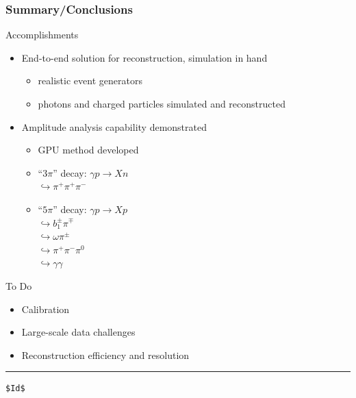 \documentclass[xcolor=dvipsnames,hyperref={pdfpagelabels=false}]{beamer}
\newcommand{\bi}{\begin{itemize}}
\newcommand{\ei}{\end{itemize}}
\newcommand{\I}{\item}
\newcommand{\ft}{\frametitle}
\begin{document}
\begin{frame}[fragile]
\ft{Summary/Conclusions}
Accomplishments
\bi
\I End-to-end solution for reconstruction, simulation in hand
   \bi
   \I realistic event generators
   \I photons and charged particles simulated and reconstructed
   \ei
\I Amplitude analysis capability demonstrated
   \bi
   \I GPU method developed
   \I ``$3\pi$'' decay: $\gamma p \rightarrow Xn$ \\ \hspace{1.1in}$\hookrightarrow\pi^+\pi^+\pi^-$
   \I ``$5\pi$'' decay: $\gamma p \rightarrow Xp$ \\ \hspace{1.05in} $\hookrightarrow b^\pm_1\pi^\mp$ \\ \hspace{1.27in}$\hookrightarrow \omega\pi^\pm$ \\ \hspace{1.39in} $\hookrightarrow\pi^+\pi^-\pi^0$ \\ \hspace{1.88in} $\hookrightarrow \gamma\gamma$
   \ei
\ei
To Do
\bi
\I Calibration
\I Large-scale data challenges
\I Reconstruction efficiency and resolution
\ei

\vskip 0.5in
\hrule
\tiny
\begin{verbatim}
$Id$
\end{verbatim}
\end{frame}
\end{document}
